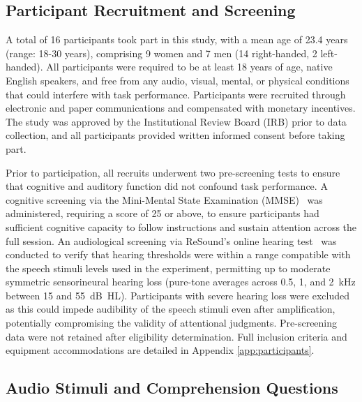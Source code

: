 \documentclass{article}
\begin{document}
\subsection{Participant Recruitment and Screening}
A total of 16 participants took part in this study, with a mean age of 23.4 years (range: 18-30 years), comprising 9 women and 7 men (14 right-handed, 2 left-handed). All participants were required to be at least 18 years of age, native English speakers, and free from any audio, visual, mental, or physical conditions that could interfere with task performance. Participants were recruited through electronic and paper communications and compensated with monetary incentives. The study was approved by the
Institutional Review Board (IRB) prior to data collection, and all
participants provided written informed consent before taking part.


Prior to participation, all recruits underwent two pre-screening tests to
ensure that cognitive and auditory function did not confound task
performance. A cognitive screening via the Mini-Mental State Examination
(MMSE)~\cite{folstein1975mini} was administered, requiring a score of 25 or
above, to ensure participants had sufficient cognitive capacity to follow
instructions and sustain attention across the full session. An audiological
screening via ReSound's online hearing test~\cite{resound_hearing_test} was
conducted to verify that hearing thresholds were within a range compatible
with the speech stimuli levels used in the experiment, permitting up to
moderate symmetric sensorineural hearing loss (pure-tone averages across
0.5, 1, and 2~kHz between 15 and 55~dB~HL). Participants with severe
hearing loss were excluded as this could impede audibility of the speech
stimuli even after amplification, potentially compromising the validity of
attentional judgments. Pre-screening data were not retained after eligibility determination. Full inclusion criteria and equipment accommodations are detailed in Appendix \ref{app:participants}.

\subsection{Audio Stimuli and Comprehension Questions}
\end{document}
